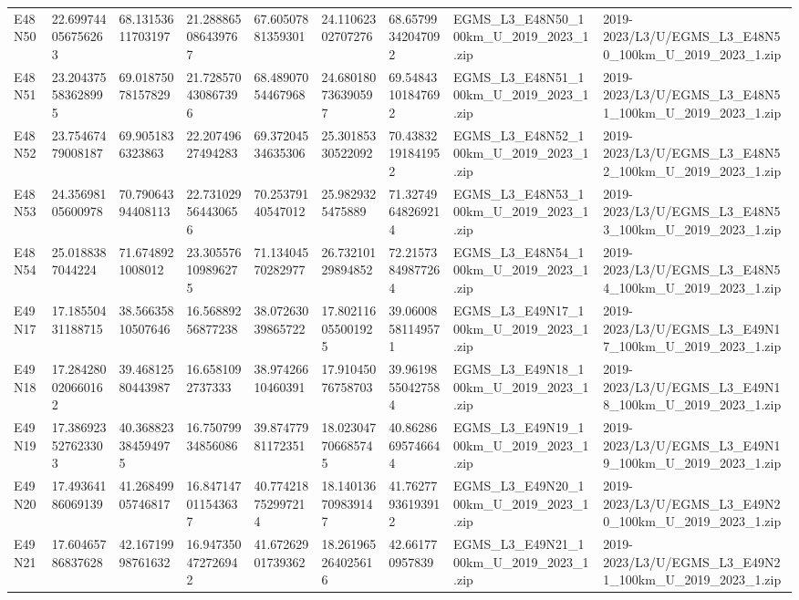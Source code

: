 \begin{landscape}
\begin{longtable}{lllllllll}
E48N50 & 22.699744056756263 & 68.13153611703197 & 21.288865086439767 & 67.60507881359301 & 24.11062302707276 & 68.65799342047092 & EGMS\_L3\_E48N50\_100km\_U\_2019\_2023\_1.zip & 2019-2023/L3/U/EGMS\_L3\_E48N50\_100km\_U\_2019\_2023\_1.zip \\
E48N51 & 23.204375583628995 & 69.01875078157829 & 21.728570430867396 & 68.48907054467968 & 24.680180736390597 & 69.54843101847692 & EGMS\_L3\_E48N51\_100km\_U\_2019\_2023\_1.zip & 2019-2023/L3/U/EGMS\_L3\_E48N51\_100km\_U\_2019\_2023\_1.zip \\
E48N52 & 23.75467479008187 & 69.9051836323863 & 22.20749627494283 & 69.37204534635306 & 25.30185330522092 & 70.43832191841952 & EGMS\_L3\_E48N52\_100km\_U\_2019\_2023\_1.zip & 2019-2023/L3/U/EGMS\_L3\_E48N52\_100km\_U\_2019\_2023\_1.zip \\
E48N53 & 24.35698105600978 & 70.79064394408113 & 22.731029564430656 & 70.25379140547012 & 25.9829325475889 & 71.32749648269214 & EGMS\_L3\_E48N53\_100km\_U\_2019\_2023\_1.zip & 2019-2023/L3/U/EGMS\_L3\_E48N53\_100km\_U\_2019\_2023\_1.zip \\
E48N54 & 25.0188387044224 & 71.6748921008012 & 23.305576109896275 & 71.13404570282977 & 26.73210129894852 & 72.21573849877264 & EGMS\_L3\_E48N54\_100km\_U\_2019\_2023\_1.zip & 2019-2023/L3/U/EGMS\_L3\_E48N54\_100km\_U\_2019\_2023\_1.zip \\
E49N17 & 17.18550431188715 & 38.56635810507646 & 16.56889256877238 & 38.07263039865722 & 17.802116055001925 & 39.06008581149571 & EGMS\_L3\_E49N17\_100km\_U\_2019\_2023\_1.zip & 2019-2023/L3/U/EGMS\_L3\_E49N17\_100km\_U\_2019\_2023\_1.zip \\
E49N18 & 17.284280020660162 & 39.46812580443987 & 16.6581092737333 & 38.97426610460391 & 17.91045076758703 & 39.96198550427584 & EGMS\_L3\_E49N18\_100km\_U\_2019\_2023\_1.zip & 2019-2023/L3/U/EGMS\_L3\_E49N18\_100km\_U\_2019\_2023\_1.zip \\
E49N19 & 17.386923527623303 & 40.368823384594975 & 16.75079934856086 & 39.87477981172351 & 18.023047706685745 & 40.86286695746644 & EGMS\_L3\_E49N19\_100km\_U\_2019\_2023\_1.zip & 2019-2023/L3/U/EGMS\_L3\_E49N19\_100km\_U\_2019\_2023\_1.zip \\
E49N20 & 17.49364186069139 & 41.26849905746817 & 16.847147011543637 & 40.774218752997214 & 18.140136709839147 & 41.76277936193912 & EGMS\_L3\_E49N20\_100km\_U\_2019\_2023\_1.zip & 2019-2023/L3/U/EGMS\_L3\_E49N20\_100km\_U\_2019\_2023\_1.zip \\
E49N21 & 17.60465786837628 & 42.16719998761632 & 16.947350472726942 & 41.67262901739362 & 18.261965264025616 & 42.661770957839 & EGMS\_L3\_E49N21\_100km\_U\_2019\_2023\_1.zip & 2019-2023/L3/U/EGMS\_L3\_E49N21\_100km\_U\_2019\_2023\_1.zip \\

\end{longtable}
\end{landscape}
